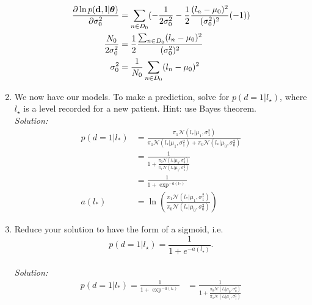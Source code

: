\documentclass[12pt,a4paper]{article}
\newcommand{\thetavec}{\boldsymbol{\theta}}
\newcommand{\dvec}{{\bf d}}
\newcommand{\lvec}{{\bf l}}
\begin{document}
\begin{enumerate}
		  \begin{align*}
		  	\frac{\partial \ln p(\dvec, \lvec | \thetavec)}{\partial \sigma_{0}^{2}} &= \sum_{n \in D_{0}} (- \frac{1}{2 \sigma_{0}^{2}} - \frac{1}{2} \frac{(l_{n} - \mu_{0})^{2}}{(\sigma_{0}^{2})^{2}}(-1)) \\
		  	\frac{N_{0}}{2 \sigma_{0}^{2}} &= \frac{1}{2} \frac{\sum_{n \in D_{0}} (l_{n} - \mu_{0})^{2}}{(\sigma_{0}^{2}) ^{2}} \\
		  	\sigma_{0}^{2} &= \frac{1}{N_{0}} \sum_{n \in D_{0}} (l_{n} - \mu_{0})^{2}
		  \end{align*}
  
  \item We now have our models.  To make a prediction, solve for $p( d=1 | l_{\star})$, where $l_{\star}$ is a level recorded for a new patient.  Hint: use Bayes theorem. \\
	  \emph{Solution:} \\
		  \begin{align*}
		  	p(d = 1 | l_{*}) &= \frac{\pi_1 \mathcal{N} (l_{*} | \mu_{1}, \sigma_{1}^{2})}{\pi_1 \mathcal{N} (l_{*} | \mu_{1}, \sigma_{1}^{2}) + \pi_0 \mathcal{N} (l_{*} | \mu_{0}, \sigma_{0}^{2})} \\
		  	&= \frac{1}{1 + \frac{\pi_0 \mathcal{N} (l_{*} | \mu_{0}, \sigma_{0}^{2})}{\pi_1 \mathcal{N} (l_{*} | \mu_{1}, \sigma_{1}^{2})}} \\
		  	&= \frac{1}{1 + \exp^{-a(l_{*})}} \\
		  	a(l_{*}) &= \ln (\frac{\pi_1 \mathcal{N} (l_{*} | \mu_{1}, \sigma_{1}^{2})}{\pi_0 \mathcal{N} (l_{*} | \mu_{0}, \sigma_{0}^{2})})
		  \end{align*}
  
  
  \item Reduce your solution to have the form of a sigmoid, i.e. 
      \begin{equation*}
         p(d=1|l_{\star}) = \frac{1}{1+e^{-a(l_{\star})}}.
      \end{equation*}
      \\
	      \emph{Solution:} \\
		      \begin{align*}
		      	p(d = 1 | l_{*}) = \frac{1}{1 + \exp ^{-a(l_{*})}} 
		      	&= \frac{1}{1 + \frac{\pi_0 \mathcal{N} (l_{*} | \mu_{0}, \sigma_{0}^{2})}{\pi_1 \mathcal{N} (l_{*} | \mu_{1}, \sigma_{1}^{2})}} \\
		      \end{align*}
   
  
\end{enumerate}
\end{document}
